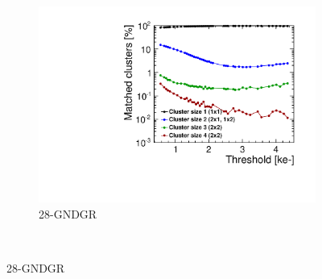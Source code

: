 \begin{figure}[htbp]
\begin{subfigure}[b]{0.33\textwidth}
    \includegraphics[width=\textwidth]{./figures/TestBeam/cluSize_THLscan_W0019_L08.pdf}
    \caption{28-GNDGR}
  \end{subfigure} \\


\end{figure}
